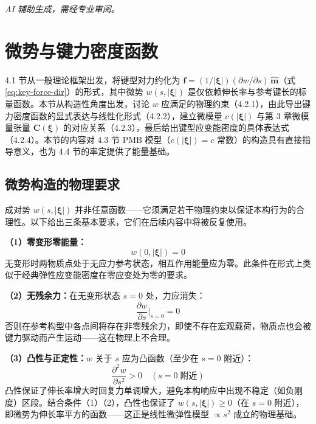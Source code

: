 \emph{AI 辅助生成，需经专业审阅。}

\section{微势与键力密度函数}

4.1 节从一般理论框架出发，将键型对力约化为 $\mathbf{f}=(1/|\boldsymbol{\xi}|)(\partial w/\partial s)\,\hat{\mathbf{m}}$（式\eqref{eq:key-force-dir}）的形式，其中微势 $w(s,|\boldsymbol{\xi}|)$ 是仅依赖伸长率与参考键长的标量函数。本节从构造性角度出发，讨论 $w$ 应满足的物理约束（4.2.1），由此导出键力密度函数的显式表达与线性化形式（4.2.2），建立微模量 $c(|\boldsymbol{\xi}|)$ 与第 3 章微模量张量 $\mathbf{C}(\boldsymbol{\xi})$ 的对应关系（4.2.3），最后给出键型应变能密度的具体表达式（4.2.4）。本节的内容对 4.3 节 PMB 模型（$c(|\boldsymbol{\xi}|)=c$ 常数）的构造具有直接指导意义，也为 4.4 节的率定提供了能量基础。

\subsection{微势构造的物理要求}

成对势 $w(s,|\boldsymbol{\xi}|)$ 并非任意函数——它须满足若干物理约束以保证本构行为的合理性。以下给出三条基本要求，它们在后续内容中将被反复使用。

\textbf{（1）零变形零能量：}
\begin{equation}
w(0,|\boldsymbol{\xi}|) = 0
\label{eq:w-zero-condition}
\end{equation}
无变形时两物质点处于无应力参考状态，相互作用能量应为零。此条件在形式上类似于经典弹性应变能密度在零应变处为零的要求。

\textbf{（2）无残余力：}在无变形状态 $s=0$ 处，力应消失：
\begin{equation}
\frac{\partial w}{\partial s}\bigg|_{s=0} = 0
\label{eq:w-derivative-zero}
\end{equation}
否则在参考构型中各点间将存在非零残余力，即使不存在宏观载荷，物质点也会被键力驱动而产生运动——这在物理上不合理。

\textbf{（3）凸性与正定性：}$w$ 关于 $s$ 应为凸函数（至少在 $s=0$ 附近）：
\begin{equation}
\frac{\partial^{2} w}{\partial s^{2}} > 0 \quad(s=0\; \text{附近})
\label{eq:w-convexity}
\end{equation}
凸性保证了伸长率增大时回复力单调增大，避免本构响应中出现不稳定（如负刚度）区段。结合条件（1）（2），凸性也保证了 $w(s,|\boldsymbol{\xi}|)\geq 0$（在 $s=0$ 附近），即微势为伸长率平方的函数——这正是线性微弹性模型 $\propto s^{2}$ 成立的物理基础。

